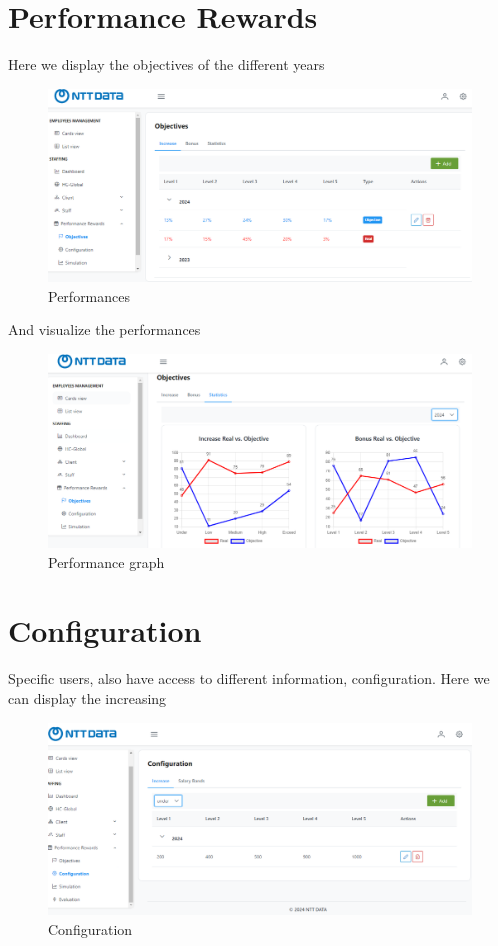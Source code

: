 \documentclass[12pt,a4paper,table,english]{article}
\begin{document}
	\section{Performance Rewards}
	
	Here we display the objectives of the different years
	\begin{figure}[H]
		\centering
		\includegraphics[width=150mm]{Image/performance}
		\caption{Performances}
		\label{fig:Performances}
	\end{figure}

	And visualize the performances
	\begin{figure}[H]
		\centering
		\includegraphics[width=150mm]{Image/performancegraph}
		\caption{Performance graph}
		\label{fig:Performance graph}
	\end{figure}

	\section{Configuration}
	
	Specific users, also have access to different information, configuration. Here we can display the increasing
	\begin{figure}[H]
		\centering
		\includegraphics[width=150mm]{Image/conf}
		\caption{Configuration}
		\label{fig:Configuration}
	\end{figure}
\end{document}
